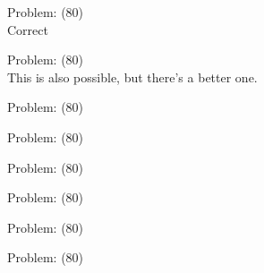 \documentclass[11pt]{article}
\begin{document}
\begin{minipage}[t]{0.5\textwidth}
  {\centering
  
Problem: (80)\\
Correct\\
  }
\end{minipage}
\begin{minipage}[t]{0.5\textwidth}
  {\centering
  
Problem: (80)\\
This is also possible, but there's a better one.\\
  }
\end{minipage}
\begin{minipage}[t]{0.5\textwidth}
  {\centering
  
Problem: (80)\\
  }
\end{minipage}
\begin{minipage}[t]{0.5\textwidth}
  {\centering
  
Problem: (80)\\
  }
\end{minipage}
\begin{minipage}[t]{0.5\textwidth}
  {\centering
  
Problem: (80)\\
  }
\end{minipage}
\begin{minipage}[t]{0.5\textwidth}
  {\centering
  
Problem: (80)\\
  }
\end{minipage}
\begin{minipage}[t]{0.5\textwidth}
  {\centering
  
Problem: (80)\\
  }
\end{minipage}
\begin{minipage}[t]{0.5\textwidth}
  {\centering
  
Problem: (80)\\
  }
\end{minipage}
\end{document}
